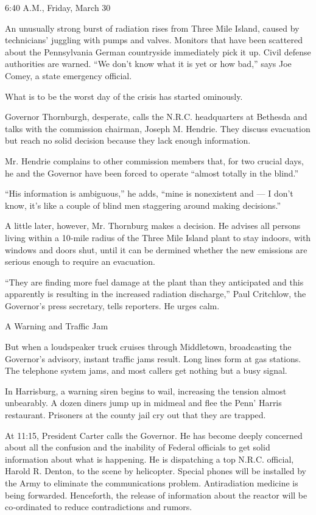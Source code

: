 6:40 A.M., Friday, March 30

An unusually strong burst of radiation rises from Three Mile Island,
caused by technicians' juggling with pumps and valves. Monitors that
have been scattered about the Pennsylvania German countryside
immediately pick it up. Civil defense authorities are warned. ``We don't
know what it is yet or how bad,'' says Joe Comey, a state emergency
official.

What is to be the worst day of the crisis has started ominously.

Governor Thornburgh, desperate, calls the N.R.C. headquarters at
Bethesda and talks with the commission chairman, Joseph M. Hendrie. They
discuss evacuation but reach no solid decision because they lack enough
information.

Mr. Hendrie complains to other commission members that, for two crucial
days, he and the Governor have been forced to operate ``almost totally
in the blind.''

``His information is ambiguous,'' he adds, ``mine is nonexistent and ---
I don't know, it's like a couple of blind men staggering around making
decisions.''

A little later, however, Mr. Thornburg makes a decision. He advises all
persons living within a 10‐mile radius of the Three Mile Island plant to
stay indoors, with windows and doors shut, until it can be dermined
whether the new emissions are serious enough to require an evacuation.

``They are finding more fuel damage at the plant than they anticipated
and this apparently is resulting in the increased radiation discharge,''
Paul Critchlow, the Governor's press secretary, tells reporters. He
urges calm.

A Warning and Traffic Jam

But when a loudspeaker truck cruises through Middletown, broadcasting
the Governor's advisory, instant traffic jams result. Long lines form at
gas stations. The telephone system jams, and most callers get nothing
but a busy signal.

In Harrisburg, a warning siren begins to wail, increasing the tension
almost unbearably. A dozen diners jump up in midmeal and flee the Penn'
Harris restaurant. Prisoners at the county jail cry out that they are
trapped.

At 11:15, President Carter calls the Governor. He has become deeply
concerned about all the confusion and the inability of Federal officials
to get solid information about what is happening. He is dispatching a
top N.R.C. official, Harold R. Denton, to the scene by helicopter.
Special phones will be installed by the Army to eliminate the
communications problem. Antiradiation medicine is being forwarded.
Henceforth, the release of information about the reactor will be
co‐ordinated to reduce contradictions and rumors.

